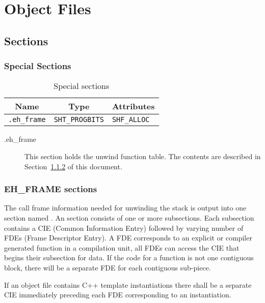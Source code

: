 
\chapter{Object Files}

\section{Sections}

\subsection{Special Sections}

\begin{table}[H]
\Hrule
  \caption{Special sections}
  \begin{center}
    \begin{tabular}[t]{l|l|l}
      \multicolumn{1}{c}{Name} & \multicolumn{1}{c}{Type}
       & \multicolumn{1}{c}{Attributes} \\
      \hline
      \texttt{.eh_frame} & \texttt{SHT_PROGBITS} & \texttt{SHF_ALLOC}
    \end{tabular}
  \end{center}
\Hrule
\end{table}

\begin{description}
 \item[.eh_frame] This section holds the unwind function table.
                      The contents are described in Section~\ref{sec_eh_frame}
                      of this document.
\end{description}

\subsection{EH\_FRAME sections}
\label{sec_eh_frame}

The call frame information needed for unwinding the stack is output into
one section named
.  An  section consists of one or more
subsections. Each subsection contains a CIE (Common Information Entry)
followed by varying number of FDEs (Frame Descriptor Entry). A FDE
corresponds to an explicit or compiler generated function in a
compilation unit, all FDEs can access the CIE that begins their
subsection for data.  If the code for a function is not one contiguous
block, there will be a separate FDE for each contiguous sub-piece.

If an object file contains C++ template instantiations there shall be
a separate CIE immediately preceding each FDE corresponding to an
instantiation.

